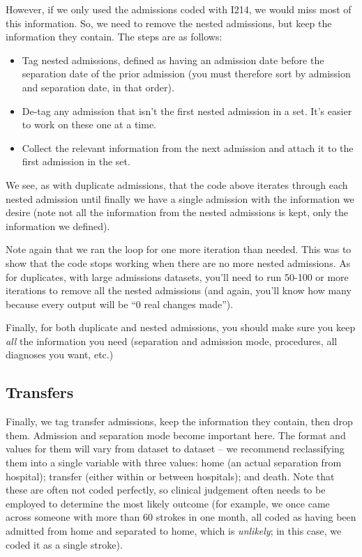 \documentclass[11pt]{article}
\begin{document}
However, if we only used the admissions coded with I214, we would miss most of this information. 
So, we need to remove the nested admissions, but keep the information they contain. 
The steps are as follows:
\begin{itemize}
\item Tag nested admissions, defined as having an admission date before 
the separation date of the prior admission (you must therefore sort by admission 
and separation date, in that order).
\item De-tag any admission that isn't the first nested admission in a set. 
It's easier to work on these one at a time. 
\item Collect the relevant information from the next admission and attach it to the
first admission in the set. 
\end{itemize}

\color{Blue4}
\begin{stlog}\end{stlog}
\color{black}

We see, as with duplicate admissions, that the code above iterates through each nested admission until
finally we have a single admission with the information we desire (note
not all the information from the nested admissions is kept, only the 
information we defined). 

Note again that we ran the loop for one more iteration than needed. This was
to show that the code stops working when there are no more nested admissions. 
As for duplicates, with large admissions datasets, you'll need to run 50-100 or more
iterations to remove all the nested admissions (and again, you'll know how many because 
every output will be ``0 real changes made''). 

Finally, for both duplicate and nested admissions, you should make sure you keep
\emph{all} the information you need (separation and admission mode, procedures, 
all diagnoses you want, etc.)

\clearpage
\subsection{Transfers}

Finally, we tag transfer admissions, keep the information they contain,
then drop them. Admission and separation mode become important here.
The format and values for them will vary from dataset to dataset --
we recommend reclassifying them into a single variable with three values:
home (an actual separation from hospital); transfer (either within or between hospitals); 
and death. Note that these are often not coded perfectly,
so clinical judgement often needs to be employed to determine the most
likely outcome (for example, we once came across someone with more than 60 strokes
in one month, all coded as having been admitted from home and separated to home,
which is \emph{unlikely}; in this case, we coded it as a single stroke).
\end{document}
